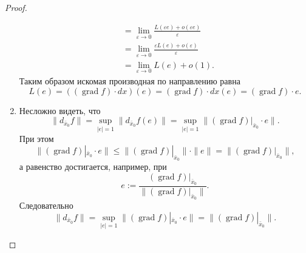 \documentclass[12pt,a4paper]{article}
\DeclareMathOperator{\grad}{grad}
\begin{document}
\begin{proof}
\begin{enumerate}
\begin{align*}
                    &= \lim_{\varepsilon \to 0} \frac{L(\varepsilon e) + o(\varepsilon e)}{\varepsilon}\\
                    &= \lim_{\varepsilon \to 0} \frac{\varepsilon L(e) + o(\varepsilon)}{\varepsilon}\\
                    &= \lim_{\varepsilon \to 0} L(e) + o(1).
                \end{align*}
                Таким образом искомая производная по направлению равна
                \[L(e) = ((\grad f) \cdot dx)(e) = (\grad f) \cdot dx(e) = (\grad f) \cdot e.\]
            \item Несложно видеть, что
                \[
                    \|d_{\bar{x}_0}f\|
                    = \sup_{|e| = 1} \|d_{\bar{x}_0}f(e)\|
                    = \sup_{|e| = 1} \|(\grad f)|_{\bar{x}_0} \cdot e\|.
                \]
                При этом
                \[
                    \|(\grad f)|_{\bar{x}_0} \cdot e\|
                    \leqslant \|(\grad f)|_{\bar{x}_0}\| \cdot \|e\|
                    = \|(\grad f)|_{\bar{x}_0}\|,
                \]
                а равенство достигается, например, при
                \[e := \frac{(\grad f)|_{\bar{x}_0}}{\|(\grad f)|_{\bar{x}_0}\|}.\]
                Следовательно
                \[
                    \|d_{\bar{x}_0}f\|
                    = \sup_{|e| = 1} \|(\grad f)|_{\bar{x}_0} \cdot e\|
                    = \|(\grad f)|_{\bar{x}_0}\|.
                \]
        \end{enumerate}
    \end{proof}

    \begin{example}
    \end{example}
\end{document}
